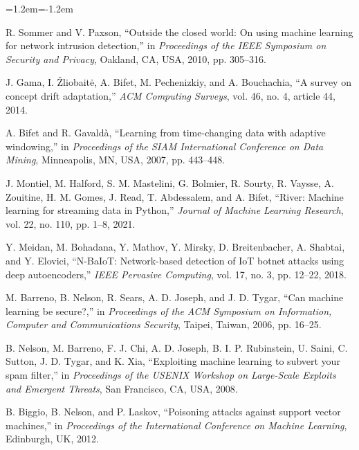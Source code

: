 \documentclass[12pt,a4paper]{report}
\begin{document}
\begin{list}{}{\leftmargin=1.2em\itemindent=-1.2em\itemsep=6pt}

\item [1] R. Sommer and V. Paxson, ``Outside the closed world: On using machine
learning for network intrusion detection,'' in \emph{Proceedings of the IEEE
Symposium on Security and Privacy}, Oakland, CA, USA, 2010, pp. 305--316.

\item [2] J. Gama, I. \v{Z}liobait\.{e}, A. Bifet, M. Pechenizkiy, and
A. Bouchachia, ``A survey on concept drift adaptation,'' \emph{ACM Computing
Surveys}, vol. 46, no. 4, article 44, 2014.

\item [3] A. Bifet and R. Gavald\`a, ``Learning from time-changing data with
adaptive windowing,'' in \emph{Proceedings of the SIAM International Conference
on Data Mining}, Minneapolis, MN, USA, 2007, pp. 443--448.

\item [4] J. Montiel, M. Halford, S. M. Mastelini, G. Bolmier, R. Sourty,
R. Vaysse, A. Zouitine, H. M. Gomes, J. Read, T. Abdessalem, and A. Bifet,
``River: Machine learning for streaming data in Python,'' \emph{Journal of
Machine Learning Research}, vol. 22, no. 110, pp. 1--8, 2021.

\item [5] Y. Meidan, M. Bohadana, Y. Mathov, Y. Mirsky, D. Breitenbacher,
A. Shabtai, and Y. Elovici, ``N-BaIoT: Network-based detection of IoT botnet
attacks using deep autoencoders,'' \emph{IEEE Pervasive Computing}, vol. 17,
no. 3, pp. 12--22, 2018.

\item [6] M. Barreno, B. Nelson, R. Sears, A. D. Joseph, and J. D. Tygar, ``Can
machine learning be secure?,'' in \emph{Proceedings of the ACM Symposium on
Information, Computer and Communications Security}, Taipei, Taiwan, 2006,
pp. 16--25.

\item [7] B. Nelson, M. Barreno, F. J. Chi, A. D. Joseph, B. I. P. Rubinstein,
U. Saini, C. Sutton, J. D. Tygar, and K. Xia, ``Exploiting machine learning to
subvert your spam filter,'' in \emph{Proceedings of the USENIX Workshop on
Large-Scale Exploits and Emergent Threats}, San Francisco, CA, USA, 2008.

\item [8] B. Biggio, B. Nelson, and P. Laskov, ``Poisoning attacks against
support vector machines,'' in \emph{Proceedings of the International Conference
on Machine Learning}, Edinburgh, UK, 2012.


\end{list}
\end{document}
